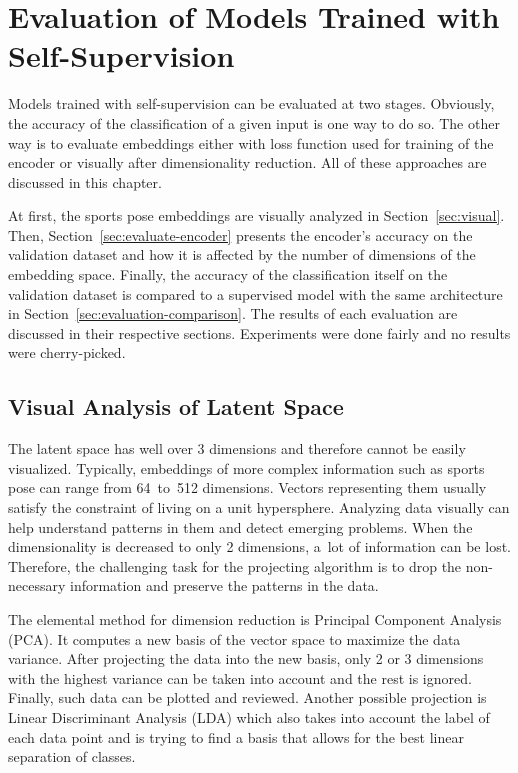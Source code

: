 \chapter{\label{chap:evaluation}Evaluation of Models Trained with Self-Supervision}

Models trained with self-supervision can be evaluated at two stages. Obviously, the accuracy of the classification of a given input is one way to do so. The other way is to evaluate embeddings either with loss function used for training of the encoder or visually after dimensionality reduction. All of these approaches are discussed in this chapter.

At first, the sports pose embeddings are visually analyzed in Section~\ref{sec:visual}. Then, Section~\ref{sec:evaluate-encoder} presents the encoder's accuracy on the validation dataset and how it is affected by the number of dimensions of the embedding space. Finally, the accuracy of the classification itself on the validation dataset is compared to a supervised model with the same architecture in Section~\ref{sec:evaluation-comparison}. The results of each evaluation are discussed in their respective sections. Experiments were done fairly and no results were cherry-picked.

\section{\label{sec:visual}Visual Analysis of Latent Space}

The latent space has well over 3 dimensions and therefore cannot be easily visualized. Typically, embeddings of more complex information such as sports pose can range from 64~to~512 dimensions. Vectors representing them usually satisfy the constraint of living on a unit hypersphere. Analyzing data visually can help understand patterns in them and detect emerging problems. When the dimensionality is decreased to only 2 dimensions, a~lot of information can be lost. Therefore, the challenging task for the projecting algorithm is to drop the non-necessary information and preserve the patterns in the data.

The elemental method for dimension reduction is Principal Component Analysis (PCA). It computes a new basis of the vector space to maximize the data variance. After projecting the data into the new basis, only 2 or 3 dimensions with the highest variance can be taken into account and the rest is ignored. Finally, such data can be plotted and reviewed. Another possible projection is Linear Discriminant Analysis (LDA) which also takes into account the label of each data point and is trying to find a basis that allows for the best linear separation of classes.


